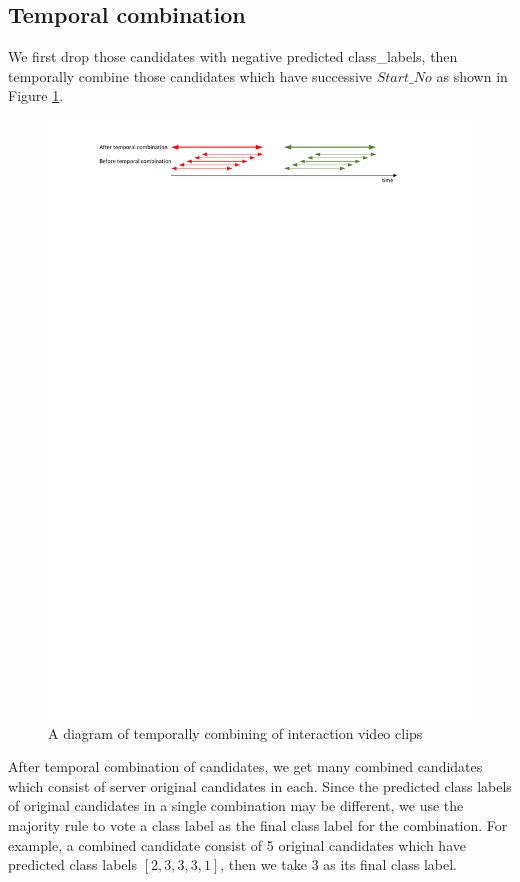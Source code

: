 \subsection{Temporal combination} 
We first drop those candidates with negative predicted class\_labels, then temporally combine those candidates which have successive \(Start\_No\) as shown in Figure \ref{fig:temporal_combination}.
\begin{figure}
	\includegraphics[trim=2cm 27cm 0cm 1cm]{fig01/temporal_combination.pdf}
	\caption{A diagram of temporally combining of interaction video clips }
	\label{fig:temporal_combination}
\end{figure}

After temporal combination of candidates, we get many combined candidates which consist of server original candidates in each. Since the predicted class labels of original candidates in a single combination may be different, we use the majority rule to vote a class label as the final class label for the combination. For example, a combined candidate consist of 5 original candidates which have predicted class labels \([2,3,3,3,1]\), then we take \(3\) as its final class label.
